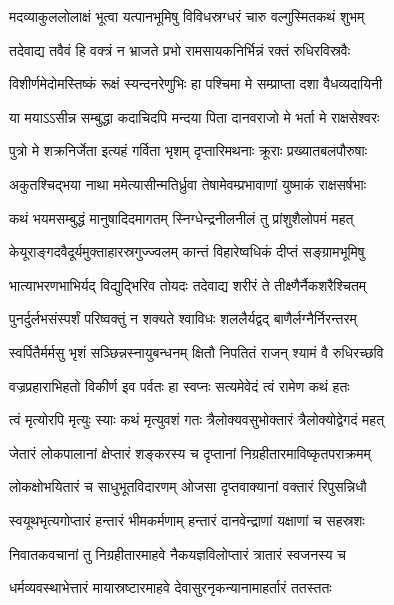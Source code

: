 \twolineshloka
{मदव्याकुललोलाक्षं भूत्वा यत्पानभूमिषु}
{विविधस्रग्धरं चारु वल्गुस्मितकथं शुभम्} %

\twolineshloka
{तदेवाद्य तवैवं हि वक्त्रं न भ्राजते प्रभो}
{रामसायकनिर्भिन्नं रक्तं रुधिरविस्रवैः} %

\twolineshloka
{विशीर्णमेदोमस्तिष्कं रूक्षं स्यन्दनरेणुभिः}
{हा पश्चिमा मे सम्प्राप्ता दशा वैधव्यदायिनी} %

\twolineshloka
{या मयाऽऽसीन्न सम्बुद्धा कदाचिदपि मन्दया}
{पिता दानवराजो मे भर्ता मे राक्षसेश्वरः} %

\twolineshloka
{पुत्रो मे शक्रनिर्जेता इत्यहं गर्विता भृशम्}
{दृप्तारिमथनाः क्रूराः प्रख्यातबलपौरुषाः} %

\twolineshloka
{अकुतश्चिद्भया नाथा ममेत्यासीन्मतिर्ध्रुवा}
{तेषामेवम्प्रभावाणां युष्माकं राक्षसर्षभाः} %

\twolineshloka
{कथं भयमसम्बुद्धं मानुषादिदमागतम्}
{स्निग्धेन्द्रनीलनीलं तु प्रांशुशैलोपमं महत्} %

\twolineshloka
{केयूराङ्गदवैदूर्यमुक्ताहारस्रगुज्ज्वलम्}
{कान्तं विहारेष्वधिकं दीप्तं सङ्ग्रामभूमिषु} %

\twolineshloka
{भात्याभरणभाभिर्यद् विद्युद्भिरिव तोयदः}
{तदेवाद्य शरीरं ते तीक्ष्णैर्नैकशरैश्चितम्} %

\twolineshloka
{पुनर्दुर्लभसंस्पर्शं परिष्वक्तुं न शक्यते}
{श्वाविधः शललैर्यद्वद् बाणैर्लग्नैर्निरन्तरम्} %

\twolineshloka
{स्वर्पितैर्मर्मसु भृशं सञ्छिन्नस्नायुबन्धनम्}
{क्षितौ निपतितं राजन् श्यामं वै रुधिरच्छवि} %

\twolineshloka
{वज्रप्रहाराभिहतो विकीर्ण इव पर्वतः}
{हा स्वप्नः सत्यमेवेदं त्वं रामेण कथं हतः} %

\twolineshloka
{त्वं मृत्योरपि मृत्युः स्याः कथं मृत्युवशं गतः}
{त्रैलोक्यवसुभोक्तारं त्रैलोक्योद्वेगदं महत्} %

\twolineshloka
{जेतारं लोकपालानां क्षेप्तारं शङ्करस्य च}
{दृप्तानां निग्रहीतारमाविष्कृतपराक्रमम्} %

\twolineshloka
{लोकक्षोभयितारं च साधुभूतविदारणम्}
{ओजसा दृप्तवाक्यानां वक्तारं रिपुसन्निधौ} %

\twolineshloka
{स्वयूथभृत्यगोप्तारं हन्तारं भीमकर्मणाम्}
{हन्तारं दानवेन्द्राणां यक्षाणां च सहस्रशः} %

\twolineshloka
{निवातकवचानां तु निग्रहीतारमाहवे}
{नैकयज्ञविलोप्तारं त्रातारं स्वजनस्य च} %

\twolineshloka
{धर्मव्यवस्थाभेत्तारं मायास्रष्टारमाहवे}
{देवासुरनृकन्यानामाहर्तारं ततस्ततः} %

